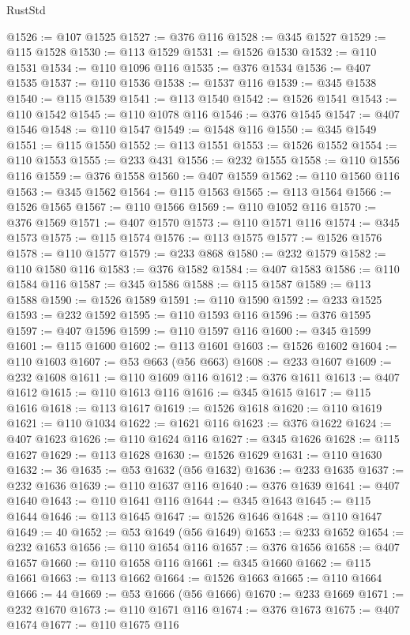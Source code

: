 \begin{lexlean}{RustStd}
\begin{coremodule}
@1526 := @107 @1525
@1527 := @376 @116
@1528 := @345 @1527
@1529 := @115 @1528
@1530 := @113 @1529
@1531 := @1526 @1530
@1532 := @110 @1531
@1534 := @110 @1096 @116
@1535 := @376 @1534
@1536 := @407 @1535
@1537 := @110 @1536
@1538 := @1537 @116
@1539 := @345 @1538
@1540 := @115 @1539
@1541 := @113 @1540
@1542 := @1526 @1541
@1543 := @110 @1542
@1545 := @110 @1078 @116
@1546 := @376 @1545
@1547 := @407 @1546
@1548 := @110 @1547
@1549 := @1548 @116
@1550 := @345 @1549
@1551 := @115 @1550
@1552 := @113 @1551
@1553 := @1526 @1552
@1554 := @110 @1553
@1555 := @233 @431
@1556 := @232 @1555
@1558 := @110 @1556 @116
@1559 := @376 @1558
@1560 := @407 @1559
@1562 := @110 @1560 @116
@1563 := @345 @1562
@1564 := @115 @1563
@1565 := @113 @1564
@1566 := @1526 @1565
@1567 := @110 @1566
@1569 := @110 @1052 @116
@1570 := @376 @1569
@1571 := @407 @1570
@1573 := @110 @1571 @116
@1574 := @345 @1573
@1575 := @115 @1574
@1576 := @113 @1575
@1577 := @1526 @1576
@1578 := @110 @1577
@1579 := @233 @868
@1580 := @232 @1579
@1582 := @110 @1580 @116
@1583 := @376 @1582
@1584 := @407 @1583
@1586 := @110 @1584 @116
@1587 := @345 @1586
@1588 := @115 @1587
@1589 := @113 @1588
@1590 := @1526 @1589
@1591 := @110 @1590
@1592 := @233 @1525
@1593 := @232 @1592
@1595 := @110 @1593 @116
@1596 := @376 @1595
@1597 := @407 @1596
@1599 := @110 @1597 @116
@1600 := @345 @1599
@1601 := @115 @1600
@1602 := @113 @1601
@1603 := @1526 @1602
@1604 := @110 @1603
@1607 := @53 @663 (@56 @663)
@1608 := @233 @1607
@1609 := @232 @1608
@1611 := @110 @1609 @116
@1612 := @376 @1611
@1613 := @407 @1612
@1615 := @110 @1613 @116
@1616 := @345 @1615
@1617 := @115 @1616
@1618 := @113 @1617
@1619 := @1526 @1618
@1620 := @110 @1619
@1621 := @110 @1034
@1622 := @1621 @116
@1623 := @376 @1622
@1624 := @407 @1623
@1626 := @110 @1624 @116
@1627 := @345 @1626
@1628 := @115 @1627
@1629 := @113 @1628
@1630 := @1526 @1629
@1631 := @110 @1630
@1632 := 36
@1635 := @53 @1632 (@56 @1632)
@1636 := @233 @1635
@1637 := @232 @1636
@1639 := @110 @1637 @116
@1640 := @376 @1639
@1641 := @407 @1640
@1643 := @110 @1641 @116
@1644 := @345 @1643
@1645 := @115 @1644
@1646 := @113 @1645
@1647 := @1526 @1646
@1648 := @110 @1647
@1649 := 40
@1652 := @53 @1649 (@56 @1649)
@1653 := @233 @1652
@1654 := @232 @1653
@1656 := @110 @1654 @116
@1657 := @376 @1656
@1658 := @407 @1657
@1660 := @110 @1658 @116
@1661 := @345 @1660
@1662 := @115 @1661
@1663 := @113 @1662
@1664 := @1526 @1663
@1665 := @110 @1664
@1666 := 44
@1669 := @53 @1666 (@56 @1666)
@1670 := @233 @1669
@1671 := @232 @1670
@1673 := @110 @1671 @116
@1674 := @376 @1673
@1675 := @407 @1674
@1677 := @110 @1675 @116

\end{coremodule}
\end{lexlean}
